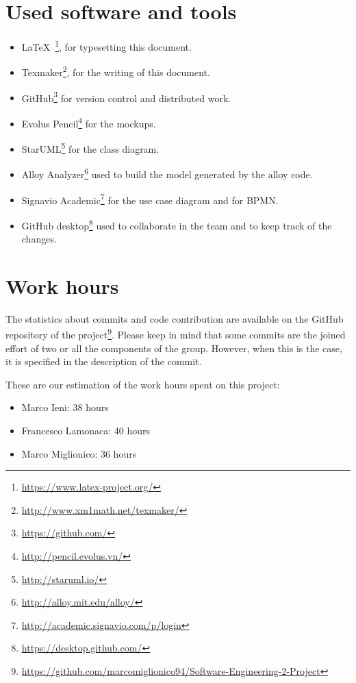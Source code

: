 \section{Used software and tools}
\begin{itemize}
    \item \LaTeX\ \footnote{\url{https://www.latex-project.org/}}, for typesetting this document.
    \item Texmaker\footnote{\url{http://www.xm1math.net/texmaker/}}, for the writing of this document.
    \item GitHub\footnote{\url{https://github.com/}} for version control and distributed work.
    \item Evolus Pencil\footnote{\url{http://pencil.evolus.vn/}} for the mockups.
    \item StarUML\footnote{\url{http://staruml.io/}} for the class diagram.
    \item Alloy Analyzer\footnote{\url{http://alloy.mit.edu/alloy/}} used to build the model generated by the alloy code.
    \item Signavio Academic\footnote{\url{http://academic.signavio.com/p/login}} for the use case diagram and for BPMN.
    \item GitHub desktop\footnote{\url{https://desktop.github.com/}} used to collaborate in the team and to keep track of the changes. 
\end{itemize}

\section{Work hours}
The statistics about commits and code contribution are available on the GitHub repository of the project\footnote{\url{https://github.com/marcomiglionico94/Software-Engineering-2-Project}}.
Please keep in mind that some commits are the joined effort of two or all the components of the group. However, when this is the case, it is specified in the description of the commit.

These are our estimation of the work hours spent on this project:
\begin{itemize}
    \item Marco Ieni: 38 hours
    \item Francesco Lamonaca: 40 hours
    \item Marco Miglionico: 36 hours
\end{itemize}
